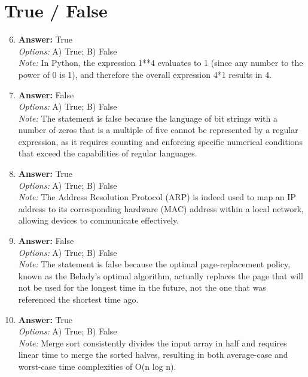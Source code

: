 \documentclass[12pt]{article}
\begin{document}
\section*{True / False}
\begin{enumerate}[label=\arabic*.]
\setcounter{enumi}{5}
\item \textbf{Answer:} True
\\ \textit{Options:} A) True; B) False
\\ \textit{Note:} In Python, the expression 1**4 evaluates to 1 (since any number to the power of 0 is 1), and therefore the overall expression 4*1 results in 4.
\item \textbf{Answer:} False
\\ \textit{Options:} A) True; B) False
\\ \textit{Note:} The statement is false because the language of bit strings with a number of zeros that is a multiple of five cannot be represented by a regular expression, as it requires counting and enforcing specific numerical conditions that exceed the capabilities of regular languages.
\item \textbf{Answer:} True
\\ \textit{Options:} A) True; B) False
\\ \textit{Note:} The Address Resolution Protocol (ARP) is indeed used to map an IP address to its corresponding hardware (MAC) address within a local network, allowing devices to communicate effectively.
\item \textbf{Answer:} False
\\ \textit{Options:} A) True; B) False
\\ \textit{Note:} The statement is false because the optimal page-replacement policy, known as the Belady's optimal algorithm, actually replaces the page that will not be used for the longest time in the future, not the one that was referenced the shortest time ago.
\item \textbf{Answer:} True
\\ \textit{Options:} A) True; B) False
\\ \textit{Note:} Merge sort consistently divides the input array in half and requires linear time to merge the sorted halves, resulting in both average-case and worst-case time complexities of O(n log n).
\end{enumerate}
\end{document}
